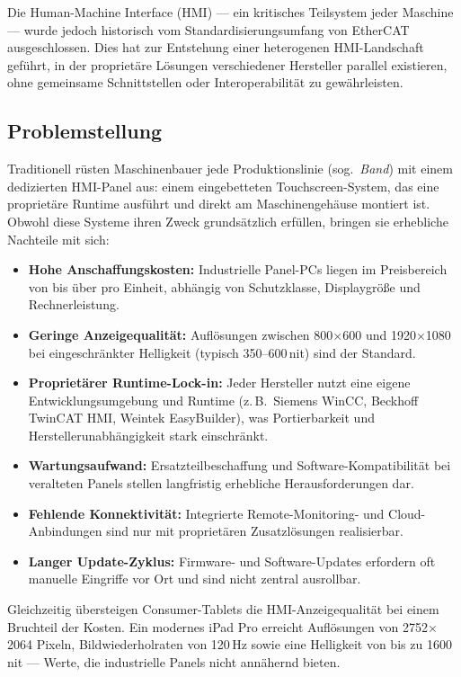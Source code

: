 ﻿\documentclass[12pt,a4paper]{article}
\begin{document}
Die Human-Machine Interface (HMI) --- ein kritisches Teilsystem jeder Maschine --- wurde
jedoch historisch vom Standardisierungsumfang von EtherCAT ausgeschlossen. Dies hat
zur Entstehung einer heterogenen HMI-Landschaft geführt, in der proprietäre Lösungen
verschiedener Hersteller parallel existieren, ohne gemeinsame Schnittstellen oder
Interoperabilität zu gewährleisten.

\subsection{Problemstellung}

Traditionell rüsten Maschinenbauer jede Produktionslinie (sog.\ \emph{Band}) mit einem
dedizierten HMI-Panel aus: einem eingebetteten Touchscreen-System, das eine proprietäre
Runtime ausführt und direkt am Maschinengehäuse montiert ist. Obwohl diese Systeme
ihren Zweck grundsätzlich erfüllen, bringen sie erhebliche Nachteile mit sich:

\begin{itemize}[leftmargin=2em]
  \item \textbf{Hohe Anschaffungskosten:} Industrielle Panel-PCs liegen im Preisbereich
    von  bis über  pro Einheit, abhängig von Schutzklasse,
    Displaygrö\ss{}e und Rechnerleistung.
  \item \textbf{Geringe Anzeigequalität:} Auflösungen zwischen 800$\times$600 und
    1920$\times$1080 bei eingeschränkter Helligkeit (typisch 350--600\,nit) sind der
    Standard.
  \item \textbf{Proprietärer Runtime-Lock-in:} Jeder Hersteller nutzt eine eigene
    Entwicklungsumgebung und Runtime (z.\,B.\ Siemens WinCC, Beckhoff TwinCAT HMI,
    Wein\-tek EasyBuilder), was Portierbarkeit und Herstellerunabhängigkeit stark einschränkt.
  \item \textbf{Wartungsaufwand:} Ersatzteilbeschaffung und Software-Kompatibilität bei
    veralteten Panels stellen langfristig erhebliche Herausforderungen dar.
  \item \textbf{Fehlende Konnektivität:} Integrierte Remote-Monitoring- und
    Cloud-Anbindungen sind nur mit proprietären Zusatzlösungen realisierbar.
  \item \textbf{Langer Update-Zyklus:} Firmware- und Software-Updates erfordern oft
    manuelle Eingriffe vor Ort und sind nicht zentral ausrollbar.
\end{itemize}

Gleichzeitig übersteigen Consumer-Tablets die HMI-Anzeigequalität bei einem Bruchteil
der Kosten. Ein modernes iPad Pro erreicht Auflösungen von 2752$\times$2064 Pixeln,
Bildwiederholraten von 120\,Hz sowie eine Helligkeit von bis zu 1600\,nit --- Werte, die
industrielle Panels nicht annähernd bieten.
\end{document}
